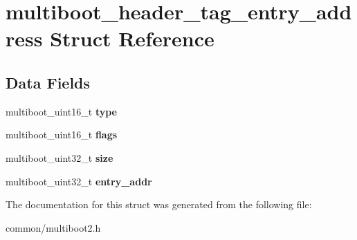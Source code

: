 \hypertarget{structmultiboot__header__tag__entry__address}{}\section{multiboot\+\_\+header\+\_\+tag\+\_\+entry\+\_\+address Struct Reference}
\label{structmultiboot__header__tag__entry__address}
\subsection*{Data Fields}
\begin{DoxyCompactItemize}
\item 
multiboot\+\_\+uint16\+\_\+t {\bfseries type}\hypertarget{structmultiboot__header__tag__entry__address_a33fbc242c73783931007191b4a0bbec5}{}\label{structmultiboot__header__tag__entry__address_a33fbc242c73783931007191b4a0bbec5}

\item 
multiboot\+\_\+uint16\+\_\+t {\bfseries flags}\hypertarget{structmultiboot__header__tag__entry__address_a9908727a741cb85cd7776f7c70bfaeea}{}\label{structmultiboot__header__tag__entry__address_a9908727a741cb85cd7776f7c70bfaeea}

\item 
multiboot\+\_\+uint32\+\_\+t {\bfseries size}\hypertarget{structmultiboot__header__tag__entry__address_a2f8d50f1461917d42ed341d5e09c0f86}{}\label{structmultiboot__header__tag__entry__address_a2f8d50f1461917d42ed341d5e09c0f86}

\item 
multiboot\+\_\+uint32\+\_\+t {\bfseries entry\+\_\+addr}\hypertarget{structmultiboot__header__tag__entry__address_a82f971e8ab5e49e81468a9b94a5418e0}{}\label{structmultiboot__header__tag__entry__address_a82f971e8ab5e49e81468a9b94a5418e0}

\end{DoxyCompactItemize}


The documentation for this struct was generated from the following file\+:\begin{DoxyCompactItemize}
\item 
common/multiboot2.\+h\end{DoxyCompactItemize}
